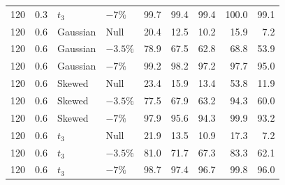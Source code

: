 \begin{table}[H]
\begin{tabular*}{\textwidth}{@{\extracolsep{\fill}}rrllrrrrr}
120 & 0.3 & $t_3$ & $-7\%$ & 99.7 & 99.4 & 99.4 & 100.0 & 99.1 \\
120 & 0.6 & Gaussian & Null & 20.4 & 12.5 & 10.2 & 15.9 & 7.2 \\
120 & 0.6 & Gaussian & $-3.5\%$ & 78.9 & 67.5 & 62.8 & 68.8 & 53.9 \\
120 & 0.6 & Gaussian & $-7\%$ & 99.2 & 98.2 & 97.2 & 97.7 & 95.0 \\
120 & 0.6 & Skewed & Null & 23.4 & 15.9 & 13.4 & 53.8 & 11.9 \\
120 & 0.6 & Skewed & $-3.5\%$ & 77.5 & 67.9 & 63.2 & 94.3 & 60.0 \\
120 & 0.6 & Skewed & $-7\%$ & 97.9 & 95.6 & 94.3 & 99.9 & 93.2 \\
120 & 0.6 & $t_3$ & Null & 21.9 & 13.5 & 10.9 & 17.3 & 7.2 \\
120 & 0.6 & $t_3$ & $-3.5\%$ & 81.0 & 71.7 & 67.3 & 83.3 & 62.1 \\
120 & 0.6 & $t_3$ & $-7\%$ & 98.7 & 97.4 & 96.7 & 99.8 & 96.0 \\
\bottomrule
\end{tabular*}
\end{table}
\endgroup
